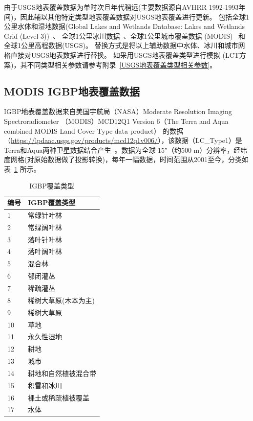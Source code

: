 由于USGS地表覆盖数据为单时次且年代稍远(主要数据源自AVHRR 1992-1993年间)，因此辅以其他特定类型地表覆盖数据对USGS地表覆盖进行更新。
包括全球1公里水体和湿地数据(Global Lakes and Wetlands Database: Lakes and Wetlands Grid (Level 3))~\citep{lehner2004development}、
全球1公里冰川数据~\citep{RGIConsortium2017}、全球1公里城市覆盖数据 (MODIS)~\citep{schneider2009new} 和全球1公里高程数据(USGS)。
替换方式是将以上辅助数据中水体、冰川和城市网格直接对USGS地表数据进行替换。
如采用USGS地表覆盖类型进行模拟 (LCT方案)，其不同类型相关参数请参考附录~\ref{USGS地表覆盖类型相关参数}。

\subsection{MODIS IGBP地表覆盖数据}\label{IGBP地表覆盖数据}
IGBP地表覆盖数据来自美国宇航局（NASA）Moderate Resolution Imaging Spectroradiometer 
（MODIS）MCD12Q1 Version 6（The Terra and Aqua combined MODIS Land Cover Type data product）
的数据（\url{https://lpdaac.usgs.gov/products/mcd12q1v006/}），该数据（LC\_Type1）是Terra和Aqua两种卫星数据结合产生~\citep{Friedl2019}。数据为全球 \ang{;;15}（约500 m）分辨率，经纬度网格(对原始数据做了投影转换)，每年一幅数据，时间范围从2001至今，分类如表~\ref{tab:IGBP覆盖类型} 所示。

\begin{table}[htbp]
\centering
\caption{IGBP覆盖类型}
\label{tab:IGBP覆盖类型}
\begin{tabular}{@{}ll@{}}
\toprule
编号 & IGBP覆盖类型     \\ \midrule
1  & 常绿针叶林           \\
2  & 常绿阔叶林      \\
3  & 落叶针叶林     \\
4  & 落叶阔叶林 \\
5  & 混合林     \\
6  & 郁闭灌丛      \\
7  & 稀疏灌丛           \\
8  & 稀树大草原(木本为主)         \\
9  & 稀树大草原     \\
10 & 草地         \\
11 & 永久性湿地        \\
12 & 耕地        \\
13 & 城市        \\
14 & 耕地和自然植被混合带        \\
15 & 积雪和冰川        \\
16 & 裸土或稀疏植被覆盖       \\ 
17 & 水体           \\ \bottomrule
\end{tabular}
\end{table}

